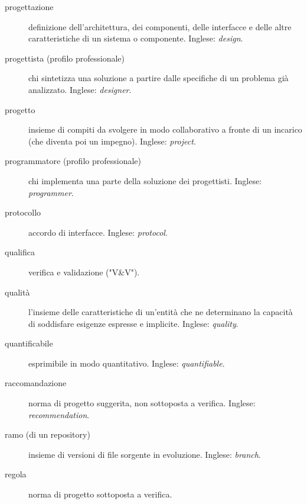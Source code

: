 \documentclass[a4paper]{article}
\begin{document}
\begin{description}
	\item[progettazione] 

			definizione dell'architettura, dei componenti, delle interfacce e delle altre caratteristiche di un sistema o componente. Inglese: \emph{design}.
			
	\item[progettista (profilo professionale)] 

			chi sintetizza una soluzione a partire dalle specifiche di un problema già analizzato. Inglese: \emph{designer}.
			
	\item[progetto] 

			insieme di compiti da svolgere in modo collaborativo a fronte di un incarico (che diventa poi un impegno). Inglese: \emph{project}.
			
	\item[programmatore (profilo professionale)] 

			chi implementa una parte della soluzione dei progettisti. Inglese: \emph{programmer}.
			
	\item[protocollo] 

			accordo di interfacce. Inglese: \emph{protocol}.
			
	\item[qualifica] 

			verifica e validazione ("V\&{}V").
			
	\item[qualità] 

			l'insieme delle caratteristiche di un'entità che ne determinano la capacità di soddisfare esigenze espresse e implicite. Inglese: \emph{quality}.
			
	\item[quantificabile] 

			esprimibile in modo quantitativo. Inglese: \emph{quantifiable}.
			
	\item[raccomandazione] 

			norma di progetto suggerita, non sottoposta a verifica. Inglese: \emph{recommendation}.
			
	\item[ramo (di un repository)] 

			insieme di versioni di file sorgente in evoluzione. Inglese: \emph{branch}.
			
	\item[regola] 

			norma di progetto sottoposta a verifica.
			

\end{description}
\end{document}
